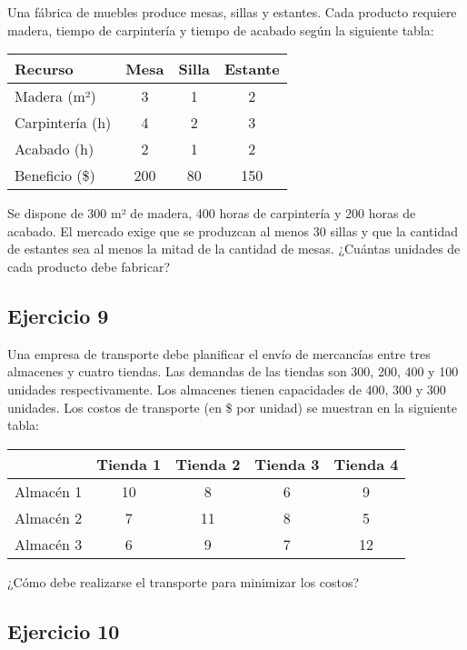 \documentclass[12pt]{article}
\begin{document}
Una fábrica de muebles produce mesas, sillas y estantes. Cada producto requiere madera, tiempo de carpintería y tiempo de acabado según la siguiente tabla:

\begin{center}
\begin{tabular}{lccc}
\toprule
Recurso & Mesa & Silla & Estante \\
\midrule
Madera (m²) & 3 & 1 & 2 \\
Carpintería (h) & 4 & 2 & 3 \\
Acabado (h) & 2 & 1 & 2 \\
\midrule
Beneficio (\$) & 200 & 80 & 150 \\
\bottomrule
\end{tabular}
\end{center}

Se dispone de 300 m² de madera, 400 horas de carpintería y 200 horas de acabado. El mercado exige que se produzcan al menos 30 sillas y que la cantidad de estantes sea al menos la mitad de la cantidad de mesas. ¿Cuántas unidades de cada producto debe fabricar?

\subsection{Ejercicio 9}

Una empresa de transporte debe planificar el envío de mercancías entre tres almacenes y cuatro tiendas. Las demandas de las tiendas son 300, 200, 400 y 100 unidades respectivamente. Los almacenes tienen capacidades de 400, 300 y 300 unidades. Los costos de transporte (en \$ por unidad) se muestran en la siguiente tabla:

\begin{center}
\begin{tabular}{lcccc}
\toprule
& Tienda 1 & Tienda 2 & Tienda 3 & Tienda 4 \\
\midrule
Almacén 1 & 10 & 8 & 6 & 9 \\
Almacén 2 & 7 & 11 & 8 & 5 \\
Almacén 3 & 6 & 9 & 7 & 12 \\
\bottomrule
\end{tabular}
\end{center}

¿Cómo debe realizarse el transporte para minimizar los costos?

\subsection{Ejercicio 10}
\end{document}
